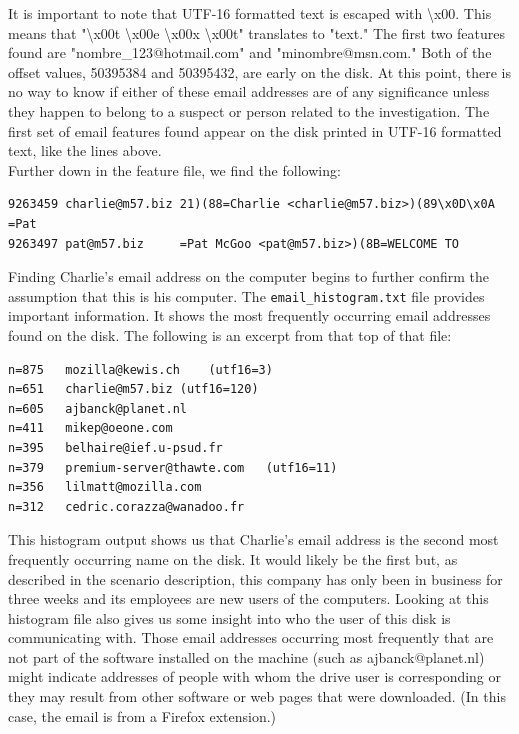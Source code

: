 It is important to note that UTF-16 formatted text is escaped with \textbackslash x00. This means that "\textbackslash x00t \textbackslash x00e \textbackslash x00x \textbackslash x00t" translates to "text." The first two features found are "nombre\_123@hotmail.com" and "minombre@msn.com."  Both of the offset values, 50395384 and 50395432, are early on the disk. At this point, there is no way to know if either of these email addresses are of any significance unless they happen to belong to a suspect or person related to the investigation. The first set of email features found appear on the disk printed in UTF-16 formatted text, like the lines above.\\

Further down in the feature file, we find the following:
\lstset{style=customfile}
\begin{lstlisting}
9263459	charlie@m57.biz	21)(88=Charlie <charlie@m57.biz>)(89\x0D\x0A    =Pat
9263497	pat@m57.biz	    =Pat McGoo <pat@m57.biz>)(8B=WELCOME TO
\end{lstlisting}

Finding Charlie's email address on the computer begins to further confirm the assumption that this is his computer. The \texttt{email\_histogram.txt} file provides important information. It shows the most frequently occurring email addresses found on the disk. The following is an excerpt from that top of that file:
\lstset{style=customfile}
\begin{lstlisting}
n=875	mozilla@kewis.ch	(utf16=3)
n=651	charlie@m57.biz	(utf16=120)
n=605	ajbanck@planet.nl
n=411	mikep@oeone.com
n=395	belhaire@ief.u-psud.fr
n=379	premium-server@thawte.com	(utf16=11)
n=356	lilmatt@mozilla.com
n=312	cedric.corazza@wanadoo.fr
\end{lstlisting}
This histogram output shows us that Charlie's email address is the second most frequently occurring name on the disk. It would likely be the first but, as described in the scenario description, this company has only been in business for three weeks and its employees are new users of the computers. Looking at this histogram file also gives us some insight into who the user of this disk is communicating with. Those email addresses occurring most frequently that are not part of the software installed on the machine (such as ajbanck@planet.nl) might indicate addresses of people with whom the drive user is corresponding or they may result from other software or web pages that were downloaded. (In this case, the email is from a Firefox extension.)\\

